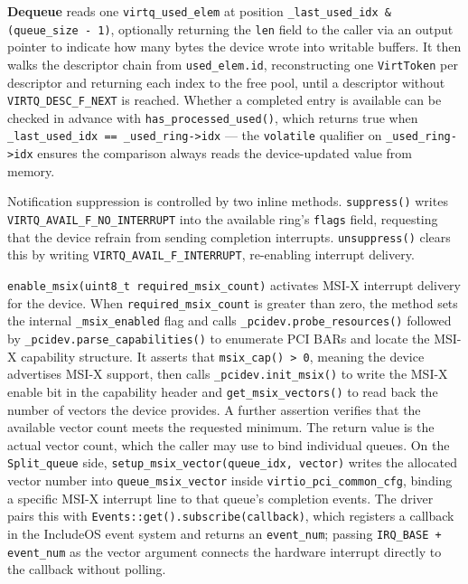\documentclass[12pt, a4paper, oneside]{report}
\begin{document}
\textbf{Dequeue} reads one \texttt{virtq\_used\_elem} at position
\texttt{\_last\_used\_idx \& (queue\_size - 1)}, optionally returning the
\texttt{len} field to the caller via an output pointer to indicate how many bytes
the device wrote into writable buffers.  It then walks the descriptor chain from
\texttt{used\_elem.id}, reconstructing one \texttt{VirtToken} per descriptor and
returning each index to the free pool, until a descriptor without
\texttt{VIRTQ\_DESC\_F\_NEXT} is reached.  Whether a completed entry is
available can be checked in advance with \texttt{has\_processed\_used()}, which
returns true when \texttt{\_last\_used\_idx == \_used\_ring->idx} --- the
\texttt{volatile} qualifier on \texttt{\_used\_ring->idx} ensures the comparison
always reads the device-updated value from memory.

Notification suppression is controlled by two inline methods.
\texttt{suppress()} writes \texttt{VIRTQ\_AVAIL\_F\_NO\_INTERRUPT} into the
available ring's \texttt{flags} field, requesting that the device refrain from
sending completion interrupts.  \texttt{unsuppress()} clears this by writing
\texttt{VIRTQ\_AVAIL\_F\_INTERRUPT}, re-enabling interrupt delivery.

\texttt{enable\_msix(uint8\_t required\_msix\_count)} activates MSI-X interrupt
delivery for the device.  When \texttt{required\_msix\_count} is greater than
zero, the method sets the internal \texttt{\_msix\_enabled} flag and calls
\texttt{\_pcidev.probe\_resources()} followed by
\texttt{\_pcidev.parse\_capabilities()} to enumerate PCI BARs and locate the
MSI-X capability structure.  It asserts that \texttt{msix\_cap() > 0}, meaning
the device advertises MSI-X support, then calls \texttt{\_pcidev.init\_msix()} to
write the MSI-X enable bit in the capability header and \texttt{get\_msix\_vectors()}
to read back the number of vectors the device provides.  A further assertion
verifies that the available vector count meets the requested minimum.  The return
value is the actual vector count, which the caller may use to bind individual
queues.  On the \texttt{Split\_queue} side, \texttt{setup\_msix\_vector(queue\_idx,
vector)} writes the allocated vector number into \texttt{queue\_msix\_vector}
inside \texttt{virtio\_pci\_common\_cfg}, binding a specific MSI-X interrupt line
to that queue's completion events.  The driver pairs this with
\texttt{Events::get().subscribe(callback)}, which registers a callback in the
IncludeOS event system and returns an \texttt{event\_num}; passing
\texttt{IRQ\_BASE + event\_num} as the vector argument connects the hardware
interrupt directly to the callback without polling.
\end{document}
